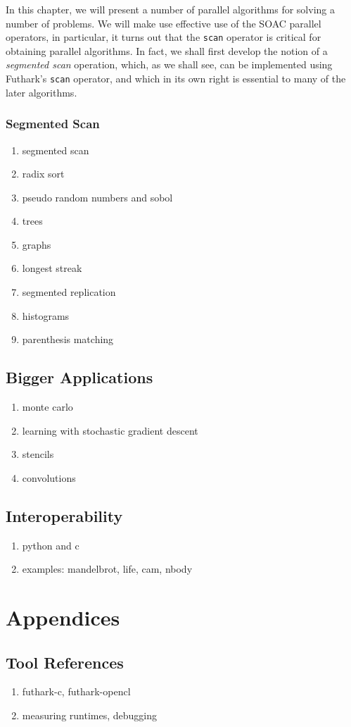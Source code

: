 \documentclass[11pt]{book}
\newcommand{\soac}[1]{\texttt{\color{eclipseBlue}#1}}
\begin{document}
In this chapter, we will present a number of parallel algorithms for
solving a number of problems. We will make use effective use of the
SOAC parallel operators, in particular, it turns out that the
\soac{scan} operator is critical for obtaining parallel algorithms. In
fact, we shall first develop the notion of a \emph{segmented scan}
operation, which, as we shall see, can be implemented using Futhark's \soac{scan}
operator, and which in its own right is essential to many of the later
algorithms.

\section{Segmented Scan}



\begin{enumerate}
\item segmented scan
\item radix sort

\item pseudo random numbers and sobol
\item trees
\item graphs
\item longest streak
\item segmented replication
\item histograms
\item parenthesis matching
\end{enumerate}

\chapter{Bigger Applications}
\begin{enumerate}
\item monte carlo
\item learning with stochastic gradient descent
\item stencils
\item convolutions
\end{enumerate}

\chapter{Interoperability}
\label{chap:interoperability}

\begin{enumerate}
\item python and c
\item examples: mandelbrot, life, cam, nbody
\end{enumerate}




\appendix

\part{Appendices}

\chapter{Tool References}
\begin{enumerate}
\item futhark-c, futhark-opencl
\item measuring runtimes, debugging
\end{enumerate}
\end{document}
